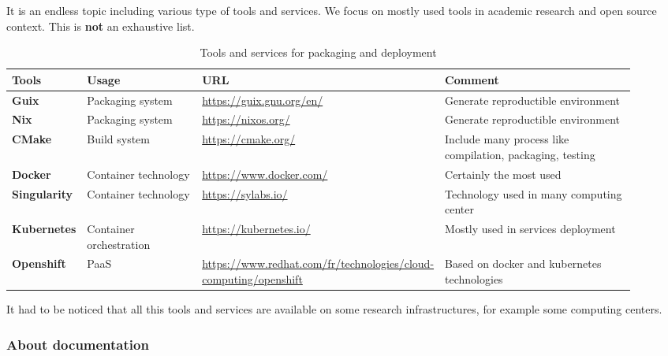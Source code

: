It is an endless topic including various type of tools and
services. We focus on mostly used tools in academic research and open
source context. This is {\bf not} an exhaustive list.

\begin{center}
\begin{table}

  \label{tab:tools_pack}
  \small
  \begin{tabular}{|p{0.12\linewidth}|p{0.2\linewidth}|p{0.25\linewidth}|p{0.35\linewidth}|} \hline

    \textbf{Tools} & \textbf{Usage} & \textbf{URL} & \textbf{Comment} \\ \hline \hline
    \textbf{Guix} & Packaging system & \url{https://guix.gnu.org/en/}
    & Generate reproductible environment \\ \hline
    \textbf{Nix} & Packaging system & \url{https://nixos.org/}
    & Generate reproductible environment \\ \hline
    \textbf{CMake} & Build system & \url{https://cmake.org/}
    & Include many process like compilation, packaging, testing  \\ \hline
    \textbf{Docker} & Container technology & \url{https://www.docker.com/}
    &  Certainly the most used \\ \hline
    \textbf{Singularity} & Container technology & \url{https://sylabs.io/}
    & Technology used in many computing center  \\ \hline
    \textbf{Kubernetes} & Container orchestration & \url{https://kubernetes.io/}
    & Mostly used in services deployment  \\ \hline
    \textbf{Openshift} & PaaS & \url{https://www.redhat.com/fr/technologies/cloud-computing/openshift}
    & Based on docker and kubernetes technologies  \\ \hline

  \end{tabular}
  \caption{Tools and services for packaging and deployment}
\end{table}
\end{center}

It had to be noticed that all this tools and services are available on
some research infrastructures, for example some computing centers.

\subsubsection{About documentation}

